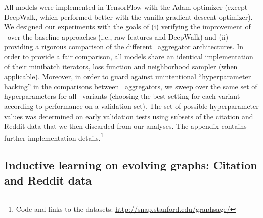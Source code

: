 All models were implemented in TensorFlow \cite{abadi2016tensorflow} with the Adam optimizer \cite{kingma2014adam} (except DeepWalk, which performed better with the vanilla gradient descent optimizer). 
We designed our experiments with the goals of (i) verifying the improvement of \name\ over the baseline approaches (i.e., raw features and DeepWalk) and (ii) providing a rigorous comparison of the different \name\ aggregator architectures. 
In order to provide a fair comparison, all models share an identical implementation of their minibatch iterators, loss function and neighborhood sampler (when applicable). 
Moreover, in order to guard against unintentional ``hyperparameter hacking'' in the comparisons between \name\ aggregators, we sweep over the same set of hyperparameters for all \name\ variants (choosing the best setting for each variant according to performance on a validation set). 
The set of possible hyperparameter values was determined on early validation tests using subsets of the citation and Reddit data that we then discarded from our analyses. 
The appendix contains further implementation details.\footnote{Code and links to the datasets:  \url{http://snap.stanford.edu/graphsage/}}




\subsection{Inductive learning on evolving graphs: Citation and Reddit data}
\label{sec:evolving}

